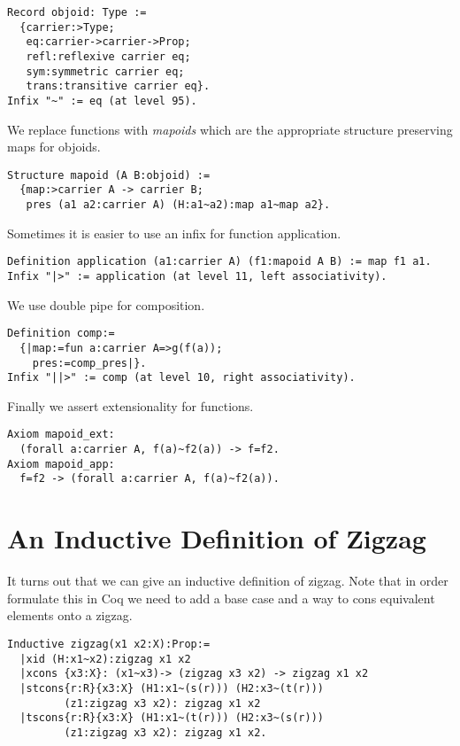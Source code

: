 \documentclass{article}
\begin{document}
\begin{verbatim}
Record objoid: Type :=
  {carrier:>Type;
   eq:carrier->carrier->Prop;
   refl:reflexive carrier eq;
   sym:symmetric carrier eq;
   trans:transitive carrier eq}.
Infix "~" := eq (at level 95).
\end{verbatim}

We replace functions with \emph{mapoids} which are the appropriate structure preserving maps for objoids.

\begin{verbatim}
Structure mapoid (A B:objoid) :=
  {map:>carrier A -> carrier B;
   pres (a1 a2:carrier A) (H:a1~a2):map a1~map a2}.
\end{verbatim}

Sometimes it is easier to use an infix for function application.

\begin{verbatim}
Definition application (a1:carrier A) (f1:mapoid A B) := map f1 a1.
Infix "|>" := application (at level 11, left associativity).
\end{verbatim}

We use double pipe for composition.
\begin{verbatim}
Definition comp:=
  {|map:=fun a:carrier A=>g(f(a));
    pres:=comp_pres|}.
Infix "||>" := comp (at level 10, right associativity).
\end{verbatim}

Finally we assert extensionality for functions.
\begin{verbatim}
Axiom mapoid_ext:
  (forall a:carrier A, f(a)~f2(a)) -> f=f2.
Axiom mapoid_app:
  f=f2 -> (forall a:carrier A, f(a)~f2(a)).
\end{verbatim}

\section{An Inductive Definition of Zigzag}
\label{sec:inductive-definition-zigzag}

It turns out that we can give an inductive definition of zigzag.
Note that in order formulate this in Coq we need to add a base case and a way to cons equivalent elements onto a zigzag.
\begin{verbatim}
Inductive zigzag(x1 x2:X):Prop:=
  |xid (H:x1~x2):zigzag x1 x2
  |xcons {x3:X}: (x1~x3)-> (zigzag x3 x2) -> zigzag x1 x2
  |stcons{r:R}{x3:X} (H1:x1~(s(r))) (H2:x3~(t(r)))
         (z1:zigzag x3 x2): zigzag x1 x2
  |tscons{r:R}{x3:X} (H1:x1~(t(r))) (H2:x3~(s(r)))
         (z1:zigzag x3 x2): zigzag x1 x2.
\end{verbatim}
\end{document}
